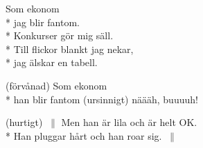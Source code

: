 \begin{SongText}
\begin{SongVerse}
Som ekonom\\*%
jag blir fantom.\\*%
Konkurser gör mig säll.\\*%
Till flickor blankt jag nekar,\\*%
jag älskar en tabell.
\end{SongVerse}
\begin{SongVerse}
(förvånad) Som ekonom\\*%
han blir fantom (ursinnigt) näääh, buuuuh!
\end{SongVerse}
\begin{SongVerse}
(hurtigt) $\:\|$ Men han är lila och är helt OK.\\*%
Han pluggar hårt och han roar sig. $\:\|$
\end{SongVerse}
\end{SongText}

